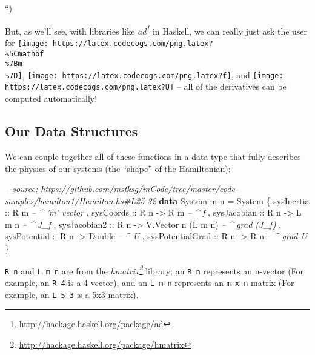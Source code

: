 \documentclass[]{article}
\newenvironment{Shaded}{}{}
\newcommand{\KeywordTok}[1]{\textcolor[rgb]{0.00,0.44,0.13}{\textbf{#1}}}
\newcommand{\DataTypeTok}[1]{\textcolor[rgb]{0.56,0.13,0.00}{#1}}
\newcommand{\CommentTok}[1]{\textcolor[rgb]{0.38,0.63,0.69}{\textit{#1}}}
\newcommand{\OtherTok}[1]{\textcolor[rgb]{0.00,0.44,0.13}{#1}}
\newcommand{\FunctionTok}[1]{\textcolor[rgb]{0.02,0.16,0.49}{#1}}
\newcommand{\NormalTok}[1]{#1}
\renewcommand{\href}[2]{#2\footnote{\url{#1}}}
\begin{document}
``)

But, as we'll see, with libraries like
\emph{\href{http://hackage.haskell.org/package/ad}{ad}} in Haskell, we can
really just ask the user for
\texttt{[image: https://latex.codecogs.com/png.latex?\\\%5Cmathbf\\\%7Bm\\\%7D]},
\texttt{[image: https://latex.codecogs.com/png.latex?f]}, and
\texttt{[image: https://latex.codecogs.com/png.latex?U]} -- all of the
derivatives can be computed automatically!

\subsection{Our Data Structures}\label{our-data-structures}

We can couple together all of these functions in a data type that fully
describes the physics of our systems (the ``shape'' of the Hamiltonian):

\begin{Shaded}
\begin{Highlighting}[]
\CommentTok{-- source: https://github.com/mstksg/inCode/tree/master/code-samples/hamilton1/Hamilton.hs#L25-32}
\KeywordTok{data} \DataTypeTok{System}\NormalTok{ m n }\FunctionTok{=} \DataTypeTok{System}
\NormalTok{    \{}\OtherTok{ sysInertia       ::} \DataTypeTok{R}\NormalTok{ m                         }\CommentTok{-- ^ 'm' vector}
\NormalTok{    ,}\OtherTok{ sysCoords        ::} \DataTypeTok{R}\NormalTok{ n }\OtherTok{->} \DataTypeTok{R}\NormalTok{ m                  }\CommentTok{-- ^ f}
\NormalTok{    ,}\OtherTok{ sysJacobian      ::} \DataTypeTok{R}\NormalTok{ n }\OtherTok{->} \DataTypeTok{L}\NormalTok{ m n                }\CommentTok{-- ^ J_f}
\NormalTok{    ,}\OtherTok{ sysJacobian2     ::} \DataTypeTok{R}\NormalTok{ n }\OtherTok{->} \DataTypeTok{V.Vector}\NormalTok{ n (}\DataTypeTok{L}\NormalTok{ m n)   }\CommentTok{-- ^ grad (J_f)}
\NormalTok{    ,}\OtherTok{ sysPotential     ::} \DataTypeTok{R}\NormalTok{ n }\OtherTok{->} \DataTypeTok{Double}               \CommentTok{-- ^ U}
\NormalTok{    ,}\OtherTok{ sysPotentialGrad ::} \DataTypeTok{R}\NormalTok{ n }\OtherTok{->} \DataTypeTok{R}\NormalTok{ n                  }\CommentTok{-- ^ grad U}
\NormalTok{    \}}
\end{Highlighting}
\end{Shaded}

\texttt{R\ n} and \texttt{L\ m\ n} are from the
\emph{\href{http://hackage.haskell.org/package/hmatrix}{hmatrix}} library; an
\texttt{R\ n} represents an n-vector (For example, an \texttt{R\ 4} is a
4-vector), and an \texttt{L\ m\ n} represents an \texttt{m\ x\ n} matrix (For
example, an \texttt{L\ 5\ 3} is a 5x3 matrix).
\end{document}
